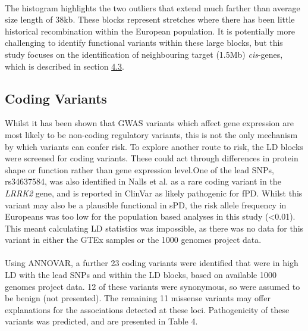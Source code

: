 \documentclass{article}
\begin{document}
\\The histogram highlights the two outliers that extend much farther than average size length of 38kb. These blocks represent stretches where there has been little historical recombination within the European population. It is potentially more challenging to identify functional variants within these large blocks, but this study focuses on the identification of neighbouring target (\pm1.5Mb) \textit{cis}-genes, which is described in section \hyperref[subsec:eQTLcoloc]{4.3}. 
\newpage
\subsection{Coding Variants}
\label{subsec:codingvariants}
Whilst it has been shown that GWAS variants which affect gene expression are most likely to be non-coding regulatory variants\cite{Nicolae2010Trait-AssociatedGWAS}, this is not the only mechanism by which variants can confer risk. To explore another route to risk, the LD blocks were screened for coding variants. These could act through differences in protein shape or function rather than gene expression level.One of the lead SNPs, rs34637584, was also identified in Nalls et al.\cite{Nalls2019IdentificationStudies} as a rare coding variant in the \textit{LRRK2} gene, and is reported in ClinVar as likely pathogenic for fPD. Whilst this variant may also be a plausible functional in sPD, the risk allele frequency in Europeans was too low for the population based analyses in this study (<0.01). This meant calculating LD statistics was impossible, as there was no data for this variant in either the GTEx samples or the 1000 genomes project data. 
\\
\\Using ANNOVAR\cite{Wang2010ANNOVAR:Data}, a further 23 coding variants were identified that were in high LD with the lead SNPs and within the LD blocks, based on available 1000 genomes project data. 12 of these variants were synonymous, so were assumed to be benign (not presented). The remaining 11 missense variants may offer explanations for the associations detected at these loci. Pathogenicity of these variants was predicted, and are presented in Table 4.
\end{document}
